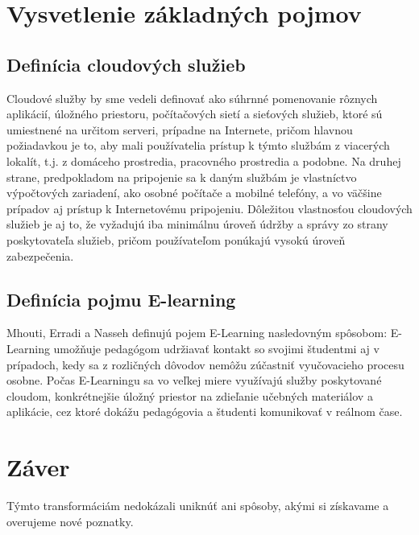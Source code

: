 \documentclass[10pt,slovak,a4paper]{article}%
\begin{document}
\section{Vysvetlenie základných pojmov}

\subsection{Definícia cloudových služieb}


Cloudové služby by sme vedeli definovať ako súhrnné pomenovanie rôznych aplikácií, úložného priestoru, počítačových sietí a sieťových služieb, ktoré sú umiestnené na určitom serveri, prípadne na Internete, pričom hlavnou požiadavkou je to, aby mali používatelia prístup k týmto službám z viacerých lokalít, t.j. z domáceho prostredia, pracovného prostredia a podobne.\cite{Babu_enrichingeducation}\cite{Narkar_cloud-basededucation} Na druhej strane, predpokladom na pripojenie sa k daným službám je vlastníctvo výpočtových zariadení, ako osobné počítače a mobilné telefóny, a vo väčšine prípadov aj prístup k Internetovému pripojeniu. Dôležitou vlastnosťou cloudových služieb je aj to, že vyžadujú iba minimálnu úroveň údržby a správy zo strany poskytovateľa služieb, pričom používateľom ponúkajú vysokú úroveň zabezpečenia.\cite{Babu_enrichingeducation}  

\subsection{Definícia pojmu E-learning}


Mhouti, Erradi a Nasseh definujú pojem E-Learning nasledovným spôsobom: \cite{Mhouti_benefits_challenges} E-Learning umožňuje pedagógom udržiavať kontakt so svojimi študentmi aj v prípadoch, kedy sa z rozličných dôvodov nemôžu zúčastniť vyučovacieho procesu osobne. Počas E-Learningu sa vo veľkej miere využívajú služby poskytované cloudom, konkrétnejšie úložný priestor na zdieľanie učebných materiálov a aplikácie, cez ktoré dokážu pedagógovia a študenti komunikovať v reálnom čase.  

\section{Záver}


Týmto transformáciám nedokázali uniknúť ani spôsoby, akými si získavame a overujeme nové poznatky.




\end{document}
